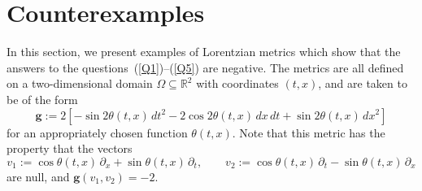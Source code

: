 \documentclass[reqno]{amsart}
\numberwithin{equation}{section}
\theoremstyle{plain}
\theoremstyle{definition}
\theoremstyle{remark}
\newcommand\g{\ensuremath{\mathbf{g}}}
\newcommand\R{\ensuremath{\mathbb{R}}}
\newcommand\bel[1]{\begin{equation}\label{#1}}
\newcommand\ee{\end{equation}}
\begin{document}
\section{Counterexamples}\label{sec:counter_examples}

In this section, we present examples of Lorentzian metrics which show that the answers to the questions~(\ref{Q1})--(\ref{Q5}) are negative. The metrics are all defined on a two-dimensional domain $\Omega \subseteq \R^2$ with coordinates $(t, x)$, and are taken to be of the form 
\bel{metric}
\g := 2 \left[ - \sin 2\theta(t, x) \, dt^2 - 2 \cos 2\theta(t, x) \, dx \, dt + \sin 2\theta(t, x) \, dx^2 \right]
\ee
for an appropriately chosen function $\theta(t, x)$. Note that this metric has the property that the vectors 
\[
v_1 := \cos\theta(t, x) \, \partial_x + \sin\theta(t, x) \, \partial_t, 
\qquad 
v_2 := \cos\theta(t, x) \, \partial_t - \sin\theta(t, x) \, \partial_x
\]
are null, and $\g(v_1, v_2) = -2$. 
\end{document}
